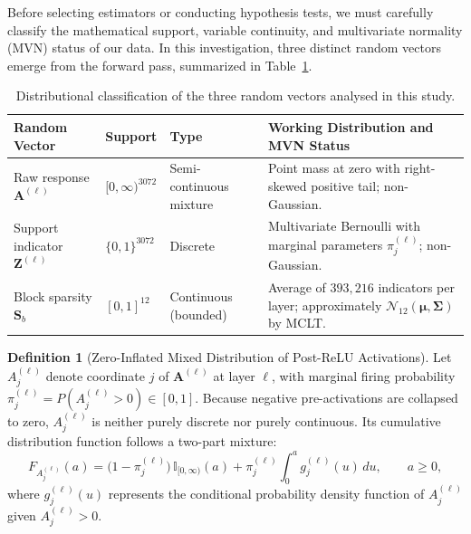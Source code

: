 \documentclass[12pt, a4paper, oneside]{report}
\theoremstyle{definition}
\newtheorem{definition}{Definition}[chapter]
\newcommand{\vect}[1]{\mathbf{#1}}
\newcommand{\mat}[1]{\mathbf{#1}}
\newcommand{\Ind}{\mathbb{I}}
\begin{document}
Before selecting estimators or conducting hypothesis tests, we must carefully classify the mathematical support, variable continuity, and multivariate normality (MVN) status of our data. In this investigation, three distinct random vectors emerge from the forward pass, summarized in Table~\ref{tab:dist_taxonomy}.

\begin{table}[htbp]
    \centering
    \caption{Distributional classification of the three random vectors analysed in this study.}
    \label{tab:dist_taxonomy}
    \small
    \begin{tabularx}{\textwidth}{@{}l l l X@{}}
        \toprule
        \textbf{Random Vector} & \textbf{Support} & \textbf{Type} & \textbf{Working Distribution and MVN Status} \\
        \midrule
        Raw response $\vect{A}^{(\ell)}$ & $[0, \infty)^{3072}$ & Semi-continuous mixture & Point mass at zero with right-skewed positive tail; non-Gaussian. \\
        Support indicator $\vect{Z}^{(\ell)}$ & $\{0, 1\}^{3072}$ & Discrete & Multivariate Bernoulli with marginal parameters $\pi_j^{(\ell)}$; non-Gaussian. \\
        Block sparsity $\vect{S}_b$ & $[0, 1]^{12}$ & Continuous (bounded) & Average of $393{,}216$ indicators per layer; approximately $\mathcal{N}_{12}(\boldsymbol{\mu}, \mat{\Sigma})$ by MCLT. \\
        \bottomrule
    \end{tabularx}
\end{table}

\begin{definition}[Zero-Inflated Mixed Distribution of Post-ReLU Activations]
Let $A_j^{(\ell)}$ denote coordinate $j$ of $\vect{A}^{(\ell)}$ at layer $\ell$, with marginal firing probability $\pi_j^{(\ell)} = P(A_j^{(\ell)} > 0) \in [0, 1]$. Because negative pre-activations are collapsed to zero, $A_j^{(\ell)}$ is neither purely discrete nor purely continuous. Its cumulative distribution function follows a two-part mixture:
\begin{equation}
    F_{A_j^{(\ell)}}(a) = \bigl(1 - \pi_j^{(\ell)}\bigr)\,\Ind_{[0, \infty)}(a) + \pi_j^{(\ell)} \int_0^a g_j^{(\ell)}(u)\,du,
    \qquad a \ge 0,
    \label{eq:mixed_cdf}
\end{equation}
where $g_j^{(\ell)}(u)$ represents the conditional probability density function of $A_j^{(\ell)}$ given $A_j^{(\ell)} > 0$.
\end{definition}
\end{document}
